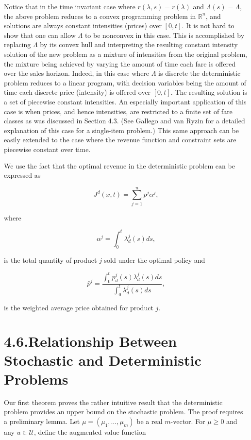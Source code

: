 Notice that in the time invariant case where \(r(\lambda, s) = r(\lambda)\) and \(\Lambda(s) = \Lambda\), the above problem reduces to a convex programming problem in \(\mathbb{R}^n\), and solutions are always constant intensities (prices) over \([0, t]\). It is not hard to show that one can allow \(\Lambda\) to be nonconvex in this case. This is accomplished by replacing \(\Lambda\) by its convex hull and interpreting the resulting constant intensity solution of the new problem as a mixture of intensities from the original problem, the mixture being achieved by varying the amount of time each fare is offered over the sales horizon. Indeed, in this case where \(\Lambda\) is discrete the deterministic problem reduces to a linear program, with decision variables being the amount of time each discrete price (intensity) is offered over \([0, t]\). The resulting solution is a set of piecewise constant intensities. An especially important application of this case is when prices, and hence intensities, are restricted to a finite set of fare classes as was discussed in Section 4.3. (See Gallego and van Ryzin for a detailed explanation of this case for a single-item problem.) This same approach can be easily extended to the case where the revenue function and constraint sets are piecewise constant over time.

We use the fact that the optimal revenue in the deterministic problem can be expressed as

\[
J^d(x, t) = \sum_{j=1}^{n} \bar{p}^j \alpha^j,
\]

where

\[
\alpha^j = \int_{0}^{t} \lambda_d^j(s)  ds,
\]

is the total quantity of product \(j\) sold under the optimal policy and

\[
\bar{p}^j = \frac{\int_{0}^{t} p_d^j(s) \lambda_d^j(s)  ds}{\int_{0}^{t} \lambda_d^j(s)  ds},
\]

is the weighted average price obtained for product \(j\).

\section{4.6.Relationship Between Stochastic and Deterministic Problems}\label{relationship-between-stochastic-and-deterministic-problems}

Our first theorem proves the rather intuitive result that the deterministic problem provides an upper bound on the stochastic problem. The proof requires a preliminary lemma. Let \(\mu = (\mu_1, \ldots, \mu_m)\) be a real \(m\)-vector. For \(\mu \geqslant 0\) and any \(u \in \mathcal{U}\), define the augmented value function

